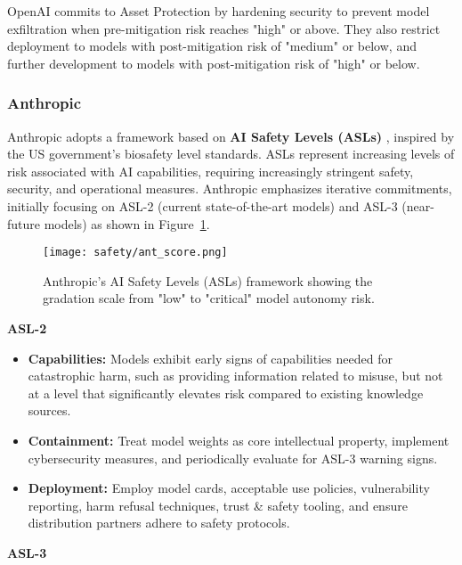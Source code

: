 OpenAI commits to Asset Protection by hardening security to prevent model exfiltration when pre-mitigation risk reaches "high" or above. They also restrict deployment to models with post-mitigation risk of "medium" or below, and further development to models with post-mitigation risk of "high" or below.

\subsubsection{Anthropic}

Anthropic adopts a framework based on \textbf{AI Safety Levels (ASLs)} , inspired by the US government's biosafety level standards. ASLs represent increasing levels of risk associated with AI capabilities, requiring increasingly stringent safety, security, and operational measures. Anthropic emphasizes iterative commitments, initially focusing on ASL-2 (current state-of-the-art models) and ASL-3 (near-future models) as shown in Figure~\ref{anthropic-risk-scoring}.

\begin{figure}[H]
\centering
\texttt{[image: safety/ant\_score.png]}
\caption{Anthropic's AI Safety Levels (ASLs) framework showing the gradation scale from "low" to "critical" model autonomy risk.}
\label{anthropic-risk-scoring}
\end{figure}

\textbf{ASL-2}

\begin{itemize}
    \item \textbf{Capabilities:} Models exhibit early signs of capabilities needed for catastrophic harm, such as providing information related to misuse, but not at a level that significantly elevates risk compared to existing knowledge sources. 
    \item \textbf{Containment:} Treat model weights as core intellectual property, implement cybersecurity measures, and periodically evaluate for ASL-3 warning signs.
    \item \textbf{Deployment:} Employ model cards, acceptable use policies, vulnerability reporting, harm refusal techniques, trust \& safety tooling, and ensure distribution partners adhere to safety protocols.  
\end{itemize}

\textbf{ASL-3}


